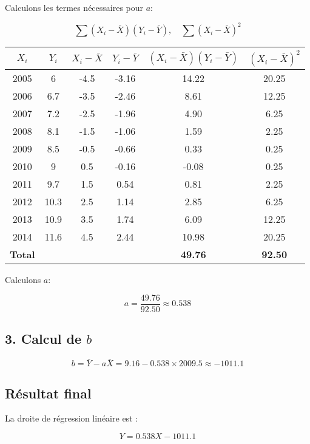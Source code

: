 \documentclass[12pt]{article}
\begin{document}
Calculons les termes nécessaires pour \(a\):

\[
\sum (X_i - \bar{X})(Y_i - \bar{Y}), \quad \sum (X_i - \bar{X})^2
\]

\begin{table}[h]
    \centering
    \begin{tabular}{|c|c|c|c|c|c|}
        \hline
        \(X_i\) & \(Y_i\) & \(X_i - \bar{X}\) & \(Y_i - \bar{Y}\) & \((X_i - \bar{X})(Y_i - \bar{Y})\) & \((X_i - \bar{X})^2\) \\
        \hline
        2005 & 6 & -4.5 & -3.16 & 14.22 & 20.25 \\
        2006 & 6.7 & -3.5 & -2.46 & 8.61 & 12.25 \\
        2007 & 7.2 & -2.5 & -1.96 & 4.90 & 6.25 \\
        2008 & 8.1 & -1.5 & -1.06 & 1.59 & 2.25 \\
        2009 & 8.5 & -0.5 & -0.66 & 0.33 & 0.25 \\
        2010 & 9 & 0.5 & -0.16 & -0.08 & 0.25 \\
        2011 & 9.7 & 1.5 & 0.54 & 0.81 & 2.25 \\
        2012 & 10.3 & 2.5 & 1.14 & 2.85 & 6.25 \\
        2013 & 10.9 & 3.5 & 1.74 & 6.09 & 12.25 \\
        2014 & 11.6 & 4.5 & 2.44 & 10.98 & 20.25 \\
        \hline
        \textbf{Total} & & & & \textbf{49.76} & \textbf{92.50} \\
        \hline
    \end{tabular}
\end{table}

Calculons \(a\):

\[
a = \frac{49.76}{92.50} \approx 0.538
\]

\subsection*{3. Calcul de \(b\)}

\[
b = \bar{Y} - a\bar{X} = 9.16 - 0.538 \times 2009.5 \approx -1011.1
\]

\subsection*{Résultat final}

La droite de régression linéaire est :

\[
Y = 0.538X - 1011.1
\]
\end{document}
